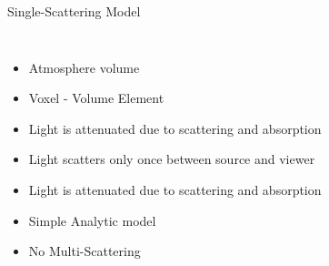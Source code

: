 \documentclass[compress,red,12pt]{beamer}
\begin{document}
\begin{frame}{Single-Scattering Model}
  \begin{columns}[c]
    \begin{itemize}
    \item <1-2> Atmosphere volume
    \item <2> Voxel - Volume Element
    \item <3> Light is attenuated due to scattering and absorption
    \item <4> Light scatters only once between source and viewer
    \item <5> Light is attenuated due to scattering and absorption
    \item <6> Simple Analytic model
    \item <6> No Multi-Scattering
    \end{itemize}


\end{columns}
\end{frame}
\end{document}
